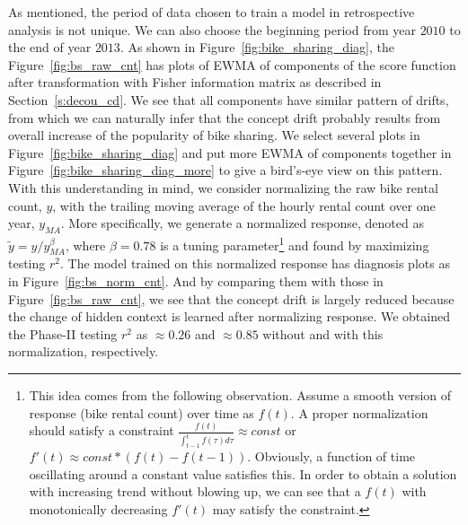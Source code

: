 \documentclass[twoside,11pt]{article}
\begin{document}
As mentioned, the period of data chosen to train a model in retrospective analysis is not unique. We can also choose the beginning period from year $2010$ to the end of year $2013$. As shown in Figure~\ref{fig:bike_sharing_diag}, the Figure~\ref{fig:bs_raw_cnt} has plots of EWMA of components of the score function after transformation with Fisher information matrix as described in Section~\ref{s:decou_cd}. We see that all components have similar pattern of drifts, from which we can naturally infer that the concept drift probably results from overall increase of the popularity of bike sharing. We select several plots in Figure~\ref{fig:bike_sharing_diag} and put more EWMA of components together in Figure~\ref{fig:bike_sharing_diag_more} to give a bird's-eye view on this pattern. With this understanding in mind, we consider normalizing the raw bike rental count, $y$, with the trailing moving average of the hourly rental count over one year, $y_{MA}$. More specifically, we generate a normalized response, denoted as $\tilde{y}=y/y_{MA}^\beta$, where $\beta=0.78$ is a tuning parameter\footnote{This idea comes from the following observation. Assume a smooth version of response (bike rental count) over time as $f(t)$. A proper normalization should satisfy a constraint $\frac{f(t)}{\int_{t-1}^{t}f(\tau)d\tau}\approx const$ or $f'(t)\approx const*(f(t)-f(t-1))$. Obviously, a function of time oscillating around a constant value satisfies this. In order to obtain a solution with increasing trend without blowing up, we can see that a $f(t)$ with
monotonically decreasing $f'(t)$ may satisfy the constraint.} and found by maximizing testing $r^2$. The model trained on this normalized response has diagnosis plots as in Figure~\ref{fig:bs_norm_cnt}. And by comparing them with those in Figure~\ref{fig:bs_raw_cnt}, we see that the concept drift is largely reduced because the change of hidden context is learned after normalizing response. We obtained the Phase-II testing $r^2$ as $\approx0.26$ and $\approx0.85$ without and with this normalization, respectively.
\end{document}
